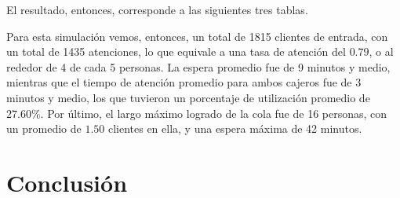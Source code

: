 \clearpage
El resultado, entonces, corresponde a las siguientes tres tablas.

Para esta simulación vemos, entonces, un total de 1815 clientes de entrada, con un total de 1435 atenciones, lo que equivale a una tasa de atención del $0.79$, o al rededor de 4 de cada 5 personas. La espera promedio fue de 9 minutos y medio, mientras que el tiempo de atención promedio para ambos cajeros fue de 3 minutos y medio, los que tuvieron un porcentaje de utilización promedio de $27.60\%$. Por último, el largo máximo logrado de la cola fue de 16 personas, con un promedio de $1.50$ clientes en ella, y una espera máxima de 42 minutos.

\section{Conclusión}

